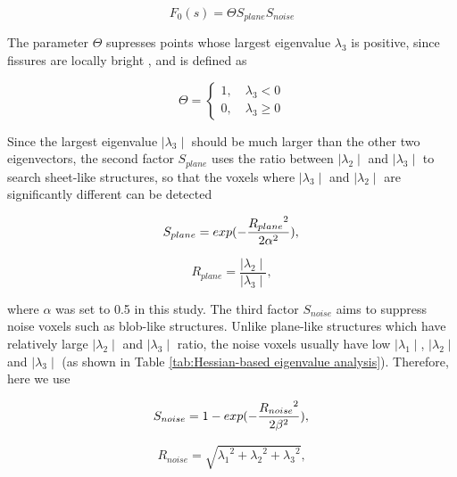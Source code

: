 {\begin{equation}
\label{eq:FissureHessian1}
F_0(s) = \Theta S_{plane} S_{noise}
\end{equation}

The parameter $\Theta$ supresses points whose largest eigenvalue $\lambda_{3}$ is positive, since fissures are locally bright , and is defined as

\begin{equation}
\label{eq:FissureHessian2}
\Theta = \begin{cases}
         1,\quad \lambda_{3}< 0\\
         0, \quad \lambda_{3}\geq0
         \end{cases}
\end{equation}

Since the largest eigenvalue $\mid\lambda_{3}\mid$ should be much larger than the other two eigenvectors, the second factor $S_{plane}$ uses the ratio between $\mid\lambda_{2}\mid$ and $\mid\lambda_{3}\mid$ to search sheet-like structures, so that the voxels where $\mid\lambda_{3}\mid$ and $\mid\lambda_{2}\mid$ are significantly different can be detected 

\begin{equation}
\label{eq:FissureHessian3}
S_{plane} = exp(-\frac{{R_{plane}}^2}{2\alpha^2}), \\
\end{equation}

\begin{equation}
\label{eq:FissureHessian4}
R_{plane} = \frac{\mid\lambda_{2}\mid}{\mid\lambda_{3}\mid},
\end{equation}

\noindent where $\alpha$ was set to 0.5 in this study. The third factor $S_{noise}$ aims to suppress noise voxels such as blob-like structures. Unlike plane-like structures which have relatively large $\mid\lambda_{2}\mid$ and $\mid\lambda_{3}\mid$ ratio, the noise voxels usually have low $\mid\lambda_{1}\mid$, $\mid\lambda_{2}\mid$ and $\mid\lambda_{3}\mid$ (as shown in Table \ref{tab:Hessian-based eigenvalue analysis}). Therefore, here we use

\begin{equation}
\label{eq:FissureHessian5}
S_{noise} = 1 - exp(-\frac{{R_{noise}}^2}{2\beta^2}), \\
\end{equation}

\begin{equation}
\label{eq:FissureHessian6}
R_{noise} = \sqrt{{\lambda_1}^2+{\lambda_2}^2+{\lambda_3}^2},
\end{equation}

}
